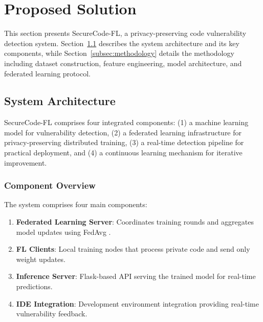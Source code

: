 \documentclass[pdflatex,sn-mathphys-num]{sn-jnl}
\theoremstyle{thmstyleone}%
\theoremstyle{thmstyletwo}%
\theoremstyle{thmstylethree}%
\begin{document}
\FloatBarrier


\section{Proposed Solution}\label{sec:proposed}

This section presents SecureCode-FL, a privacy-preserving code vulnerability detection system. Section~\ref{subsec:architecture} describes the system architecture and its key components, while Section~\ref{subsec:methodology} details the methodology including dataset construction, feature engineering, model architecture, and federated learning protocol.

\subsection{System Architecture}\label{subsec:architecture}

SecureCode-FL comprises four integrated components: (1) a machine learning model for vulnerability detection, (2) a federated learning infrastructure for privacy-preserving distributed training, (3) a real-time detection pipeline for practical deployment, and (4) a continuous learning mechanism for iterative improvement.

\subsubsection{Component Overview}\label{subsubsec:components}

The system comprises four main components:

\begin{enumerate}
    \item \textbf{Federated Learning Server}: Coordinates training rounds and aggregates model updates using FedAvg \cite{mcmahan2017communication}.
    
    \item \textbf{FL Clients}: Local training nodes that process private code and send only weight updates.
    
    \item \textbf{Inference Server}: Flask-based API serving the trained model for real-time predictions.
    
    \item \textbf{IDE Integration}: Development environment integration providing real-time vulnerability feedback.
\end{enumerate}
\end{document}
